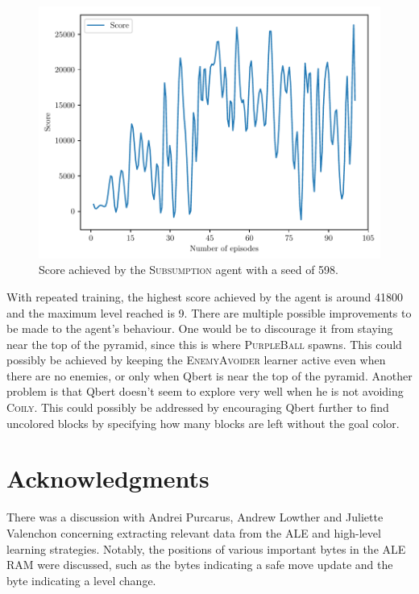 \documentclass[a4paper,titlepage]{article}
\begin{document}
	\begin{figure}[!htb]
		\centering
		\includegraphics[width=\columnwidth]{plots/seed598.pdf}
		\caption
		{Score achieved by the \textsc{Subsumption} agent with a seed of 598.}
		\label{fig:seed598}
	\end{figure}

	With repeated training, the highest score achieved by the agent is around 41800 and the maximum level reached is 9. There are multiple possible improvements to be made to the agent's behaviour. One would be to discourage it from staying near the top of the pyramid, since this is where \textsc{PurpleBall} spawns. This could possibly be achieved by keeping the \textsc{EnemyAvoider} learner active even when there are no enemies, or only when Qbert is near the top of the pyramid. Another problem is that Qbert doesn't seem to explore very well when he is not avoiding \textsc{Coily}. This could possibly be addressed by encouraging Qbert further to find uncolored blocks by specifying how many blocks are left without the goal color.

	\section*{Acknowledgments}
	There was a discussion with Andrei Purcarus, Andrew Lowther and Juliette Valenchon concerning extracting relevant data from the ALE and high-level learning strategies. Notably, the positions of various important bytes in the ALE RAM were discussed, such as the bytes indicating a safe move update and the byte indicating a level change.
	
	
	
	{}
	
\end{document}
